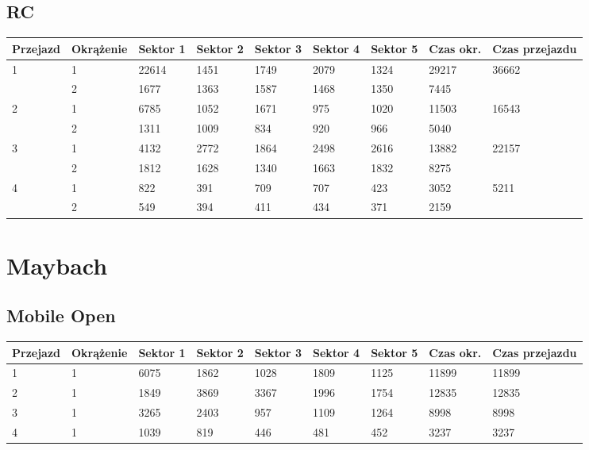 \documentclass[11pt]{article}
\begin{document}
\subsection{RC}
\begin{table}[h]
\begin{tabular}{|l|l|l|l|l|l|l|l|l|}
\hline
 Przejazd        & Okrążenie & Sektor 1 & Sektor 2 & Sektor 3 & Sektor 4 & Sektor 5 & Czas okr. & Czas przejazdu    \\ \hline
\multirow{2}{*}{1}& 1 &22614& 1451& 1749& 2079& 1324& 29217& \multirow{2}{*}{36662} \\ \cline{2-8}
& 2& 1677& 1363& 1587& 1468& 1350& 7445& \\ \hline
\multirow{2}{*}{2}& 1 &6785& 1052& 1671& 975& 1020& 11503& \multirow{2}{*}{16543} \\ \cline{2-8}
& 2& 1311& 1009& 834& 920& 966& 5040& \\ \hline
\multirow{2}{*}{3}& 1 &4132& 2772& 1864& 2498& 2616& 13882& \multirow{2}{*}{22157} \\ \cline{2-8}
& 2& 1812& 1628& 1340& 1663& 1832& 8275& \\ \hline
\multirow{2}{*}{4}& 1 &822& 391& 709& 707& 423& 3052& \multirow{2}{*}{5211} \\ \cline{2-8}
& 2& 549& 394& 411& 434& 371& 2159& \\ \hline
\end{tabular}
\end{table}
\pagebreak
\section{Maybach}
\subsection{Mobile Open}
\begin{table}[h]
\begin{tabular}{|l|l|l|l|l|l|l|l|l|}
\hline
   Przejazd        & Okrążenie & Sektor 1 & Sektor 2 & Sektor 3 & Sektor 4 & Sektor 5 & Czas okr. & Czas przejazdu    \\ \hline
\multirow{1}{*}{1}& 1 &6075& 1862& 1028& 1809& 1125& 11899& 11899\\ \hline
\multirow{1}{*}{2}& 1 &1849& 3869& 3367& 1996& 1754& 12835& 12835\\ \hline
\multirow{1}{*}{3}& 1 &3265& 2403& 957& 1109& 1264& 8998& 8998\\ \hline
\multirow{1}{*}{4}& 1 &1039& 819& 446& 481& 452& 3237& 3237\\ \hline
\end{tabular}
\end{table}
\end{document}
